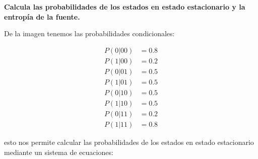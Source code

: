 \documentclass{article}
\begin{document}
\textbf{
Calcula las probabilidades de los estados en estado estacionario y la entropía de la fuente.
}

\vspace{0.5cm}

De la imagen tenemos las probabilidades condicionales:

\begin{align*}
    P(0|00) &= 0.8\\
    P(1|00) &= 0.2\\
    P(0|01) &= 0.5\\
    P(1|01) &= 0.5\\
    P(0|10) &= 0.5\\
    P(1|10) &= 0.5\\
    P(0|11) &= 0.2\\
    P(1|11) &= 0.8
\end{align*}

esto nos permite calcular las probabilidades de los estados en estado estacionario mediante un sistema de ecuaciones:
\end{document}

